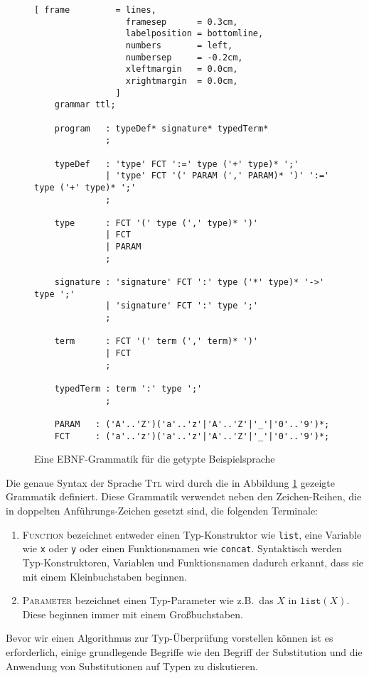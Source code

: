 \begin{figure}[!ht]
\centering
\begin{Verbatim}[ frame         = lines, 
                  framesep      = 0.3cm, 
                  labelposition = bottomline,
                  numbers       = left,
                  numbersep     = -0.2cm,
                  xleftmargin   = 0.0cm,
                  xrightmargin  = 0.0cm,
                ]
    grammar ttl;
    
    program   : typeDef* signature* typedTerm*
              ;
    
    typeDef   : 'type' FCT ':=' type ('+' type)* ';'
              | 'type' FCT '(' PARAM (',' PARAM)* ')' ':=' type ('+' type)* ';' 
              ;
    
    type      : FCT '(' type (',' type)* ')'
              | FCT                               
              | PARAM                              
              ;
    
    signature : 'signature' FCT ':' type ('*' type)* '->' type ';'                
              | 'signature' FCT ':' type ';'
              ;
    
    term      : FCT '(' term (',' term)* ')'
              | FCT    
              ;
    
    typedTerm : term ':' type ';' 
              ;
    
    PARAM   : ('A'..'Z')('a'..'z'|'A'..'Z'|'_'|'0'..'9')*;
    FCT     : ('a'..'z')('a'..'z'|'A'..'Z'|'_'|'0'..'9')*;
\end{Verbatim}
\vspace*{-0.3cm}
  \caption{Eine EBNF-Grammatik f\"ur die getypte Beispielsprache}
\label{fig:typeChecker-grammar}
\end{figure}



\noindent
Die genaue Syntax der Sprache \textsc{Ttl} wird durch die in Abbildung \ref{fig:typeChecker-grammar}
gezeigte Grammatik definiert.  Diese Grammatik verwendet neben den Zeichen-Reihen, die in doppelten
Anf\"uhrungs-Zeichen gesetzt sind, die folgenden Terminale:
\begin{enumerate}
\item \textsc{Function} bezeichnet entweder einen Typ-Konstruktor wie \texttt{list}, eine Variable
      wie \texttt{x} oder \texttt{y} oder einen Funktionsnamen wie \texttt{concat}.  Syntaktisch
      werden Typ-Konstruktoren, Variablen und Funktionsnamen dadurch erkannt, dass sie mit
      einem Kleinbuchstaben beginnen. 
\item \textsc{Parameter} bezeichnet einen Typ-Parameter wie z.B.~das $X$ in $\texttt{list}(X)$.
      Diese beginnen immer mit einem Gro{\ss}buchstaben.
\end{enumerate}
Bevor wir einen Algorithmus zur Typ-\"Uberpr\"ufung vorstellen k\"onnen ist es erforderlich,
einige grundlegende Begriffe wie 
den Begriff der Substitution und die Anwendung von Substitutionen auf Typen zu diskutieren.

